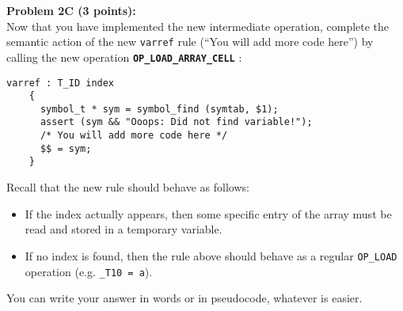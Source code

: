 {\bf Problem 2C (3 points):}
\\
Now that you have implemented the new intermediate operation, complete the semantic
action of the new \texttt{varref} rule (``You will add more code here'') by
calling 
the new operation {\bf \texttt{OP\_LOAD\_ARRAY\_CELL}}
:

\begin{lstlisting}
varref : T_ID index
    {
      symbol_t * sym = symbol_find (symtab, $1);
      assert (sym && "Ooops: Did not find variable!");
      /* You will add more code here */
      $$ = sym;
    }
\end{lstlisting}

Recall that the new rule should behave as follows:
\begin{itemize}
\item If the index actually appears, then some specific entry of the array 
must be read and stored in a temporary variable.
\item If no index is found, then the rule above should behave as a regular 
\texttt{OP\_LOAD} operation (e.g. \texttt{\_T10 = a}).
\end{itemize}

You can write your answer in words or in pseudocode, whatever is easier.

\begin{tcolorbox}[height=5in]

\end{tcolorbox}

